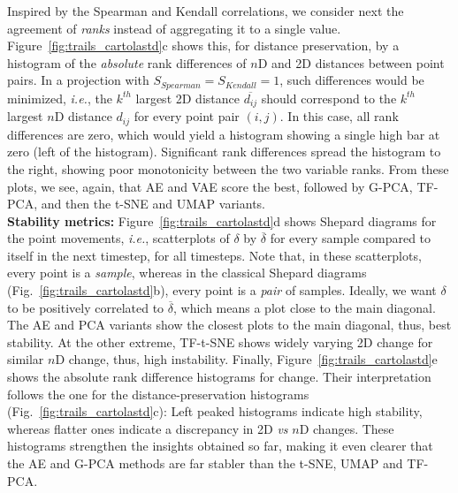 Inspired by the Spearman and Kendall correlations, we consider next the agreement of \emph{ranks} instead of aggregating it to a single value. Figure~\ref{fig:trails_cartolastd}c shows this, for distance preservation, by a histogram of the \emph{absolute} rank differences of $n$D and 2D distances between point pairs. In a projection with $S_{Spearman} = S_{Kendall} = 1$, such differences would be minimized, \emph{i.e.}, the $k^{th}$ largest 2D distance $\overline{d_{ij}}$ should correspond to the $k^{th}$ largest $n$D distance $d_{ij}$ for every point pair $(i,j)$. In this case, all rank differences are zero, which would yield a histogram showing a single high bar at zero (left of the histogram). Significant rank differences spread the histogram to the right, showing poor monotonicity between the two variable ranks. From these plots, we see, again, that AE and VAE score the best, followed by G-PCA, TF-PCA, and then the t-SNE and UMAP variants.\\

\noindent\textbf{Stability metrics:} Figure~\ref{fig:trails_cartolastd}d shows Shepard diagrams for the point movements, \emph{i.e.}, scatterplots of $\delta$ by $\overline{\delta}$ for every sample compared to itself in the next timestep, for all timesteps. Note that, in these scatterplots, every point is a \emph{sample}, whereas in the classical Shepard diagrams (Fig.~\ref{fig:trails_cartolastd}b), every point is a \emph{pair} of samples. Ideally, we want $\delta$ to be positively correlated to $\overline{\delta}$, which means a plot close to the main diagonal.
The AE and PCA variants show the closest plots to the main diagonal, thus, best stability. At the other extreme, TF-t-SNE shows widely varying 2D change for similar $n$D change, thus, high instability. Finally, Figure~\ref{fig:trails_cartolastd}e shows the absolute rank difference histograms for change. Their interpretation follows the one for the distance-preservation histograms (Fig.~\ref{fig:trails_cartolastd}c):
Left peaked histograms indicate high stability, whereas flatter ones indicate a discrepancy in 2D \emph{vs} $n$D changes. These histograms strengthen the insights obtained so far, making it even clearer that the AE and G-PCA methods are far stabler than the t-SNE, UMAP and TF-PCA.




